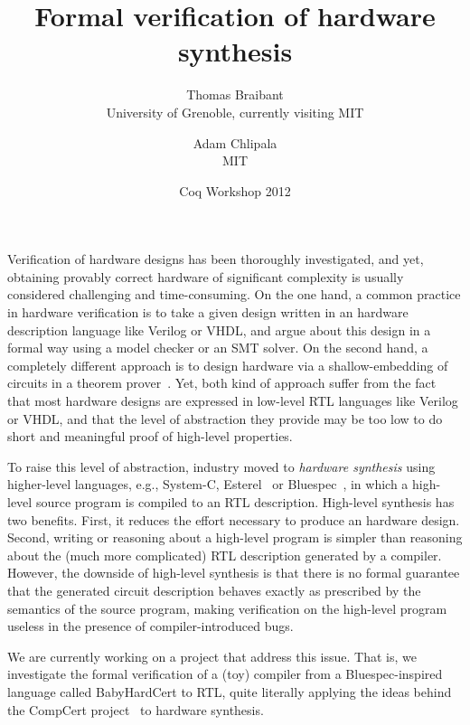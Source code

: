 \documentclass[a4]{article}
\title{Formal verification of hardware synthesis}
\author{
  Thomas Braibant\\
  University of Grenoble,
  currently visiting MIT
  \and
  Adam Chlipala\\
  MIT
}
\date{Coq Workshop 2012}
\newcommand\project{BabyHardCert}
\begin{document}
\maketitle

Verification of hardware designs has been thoroughly investigated, and
yet, obtaining provably correct hardware of significant complexity is
usually considered challenging and time-consuming. 
%
On the one hand, a common practice in hardware verification is to  take a given design
written in an hardware description language like Verilog or VHDL,
and argue about this design in a formal way using a model checker or
an SMT solver. 
%
On the second hand, a completely different approach is to design hardware via a
shallow-embedding of circuits in a theorem
prover~\cite{hanna-veritas,UCAM-CL-TR-77,hunt89,vamp,certifying-circuits-in-type-theory}. 
%
Yet, both kind of approach suffer from the fact that most hardware
designs are expressed in low-level RTL languages like Verilog or
VHDL, and that the level of abstraction they provide may be too low to
do short and meaningful proof of high-level properties. 

\medskip

To raise this level of abstraction, industry moved to \emph{hardware
  synthesis} using higher-level languages, e.g., System-C,
Esterel~\cite{DBLP:conf/birthday/Berry00} or
Bluespec~\cite{bluespec}, in which a high-level source program is
compiled to an RTL description. 
%
High-level synthesis has two benefits. 
%
First, it reduces the effort necessary to produce an hardware design.
%
Second, writing or reasoning about a high-level program is simpler
than reasoning about the (much more complicated) RTL description
generated by a compiler.
%
However, the downside of high-level synthesis is that there is no
formal guarantee that the generated circuit description behaves
exactly as prescribed by the semantics of the source
program, making verification on the high-level program useless in the
presence of compiler-introduced bugs.
%

\medskip

We are currently working on a project that address this issue.  That
is, we investigate the formal verification of a (toy) compiler from a
Bluespec-inspired language called \project{} to RTL, quite
literally applying the ideas behind the CompCert
project~\cite{Leroy-Compcert-CACM} to hardware synthesis. 

\medskip
\end{document}
